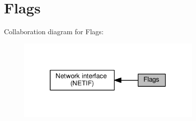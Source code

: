 \hypertarget{group__netif__flags}{}\section{Flags}
\label{group__netif__flags}
Collaboration diagram for Flags\+:
\nopagebreak
\begin{figure}[H]
\begin{center}
\leavevmode
\includegraphics[width=254pt]{group__netif__flags}
\end{center}
\end{figure}
